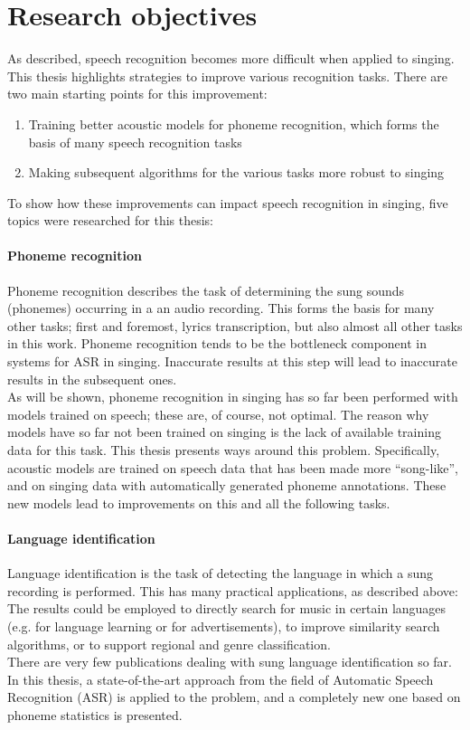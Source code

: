 \section{Research objectives}
As described, speech recognition becomes more difficult when applied to singing. This thesis highlights strategies to improve various recognition tasks. There are two main starting points for this improvement:
\begin{enumerate}
\item Training better acoustic models for phoneme recognition, which forms the basis of many speech recognition tasks
\item Making subsequent algorithms for the various tasks more robust to singing
\end{enumerate}

To show how these improvements can impact speech recognition in singing, five topics were researched for this thesis:

\paragraph{Phoneme recognition}
Phoneme recognition describes the task of determining the sung sounds (phonemes) occurring in a an audio recording. This forms the basis for many other tasks; first and foremost, lyrics transcription, but also almost all other tasks in this work. Phoneme recognition tends to be the bottleneck component in systems for ASR in singing. Inaccurate results at this step will lead to inaccurate results in the subsequent ones.\\
As will be shown, phoneme recognition in singing has so far been performed with models trained on speech; these are, of course, not optimal. The reason why models have so far not been trained on singing is the lack of available training data for this task. This thesis presents ways around this problem. Specifically, acoustic models are trained on speech data that has been made more ``song-like'', and on singing data with automatically generated phoneme annotations. These new models lead to improvements on this and all the following tasks.

\paragraph{Language identification}
Language identification is the task of detecting the language in which a sung recording is performed. This has many practical applications, as described above: The results could be employed to directly search for music in certain languages (e.g. for language learning or for advertisements), to improve similarity search algorithms, or to support regional and genre classification.\\
There are very few publications dealing with sung language identification so far. In this thesis, a state-of-the-art approach from the field of Automatic Speech Recognition (ASR) is applied to the problem, and a completely new one based on phoneme statistics is presented.

